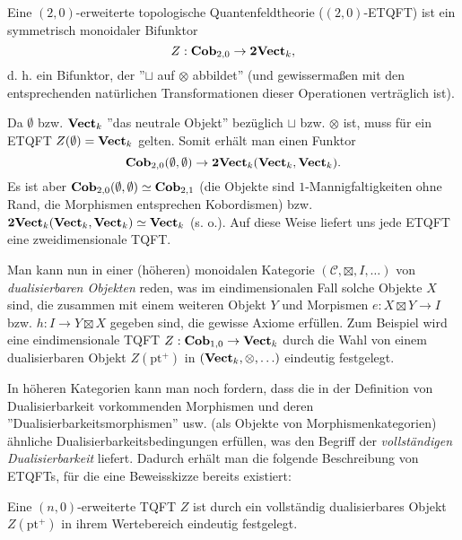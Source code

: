 \begin{Def}
Eine $(2, 0)$-erweiterte topologische Quantenfeldtheorie ($(2, 0)$-ETQFT) ist
ein symmetrisch monoidaler Bifunktor
\begin{equation}
Z: \mathbf{Cob}_{2, 0} \to \mathbf{2Vect}_k, \nonumber
\end{equation}
d. h. ein Bifunktor, der ''$\sqcup$ auf $\otimes$ abbildet'' (und
gewissermaßen mit den entsprechenden natürlichen Transformationen dieser
Operationen verträglich ist).
\end{Def}

Da $\emptyset$ bzw. $\mathbf{Vect}_k$ ''das neutrale Objekt'' bezüglich
$\sqcup$ bzw. $\otimes$ ist, muss für ein ETQFT $Z(\emptyset) =
\mathbf{Vect}_k$ gelten. Somit erhält man einen Funktor
\begin{equation}
\mathbf{Cob}_{2, 0} (\emptyset, \emptyset) \to \mathbf{2Vect}_k
(\mathbf{Vect}_k, \mathbf{Vect}_k). \nonumber
\end{equation}
Es ist aber $\mathbf{Cob}_{2, 0} (\emptyset, \emptyset) \simeq
\mathbf{Cob}_{2, 1}$ (die Objekte sind $1$-Mannigfaltigkeiten ohne Rand,
die Morphismen entsprechen Kobordismen) bzw. $\mathbf{2Vect}_k
(\mathbf{Vect}_k, \mathbf{Vect}_k) \simeq \mathbf{Vect}_k$ (s. o.).
Auf diese Weise liefert uns jede ETQFT eine zweidimensionale TQFT.


Man kann nun in einer (höheren) monoidalen Kategorie $(\mathcal{C},
\boxtimes, I, \ldots)$ von \emph{dualisierbaren Objekten} reden, was im
eindimensionalen Fall solche Objekte $X$ sind, die zusammen mit einem weiteren
Objekt $Y$ und Morpismen $e: X \boxtimes Y \to I$ bzw. $h: I \to Y \boxtimes
X$ gegeben sind, die gewisse Axiome erfüllen. Zum Beispiel wird eine
eindimensionale TQFT $Z: \mathbf{Cob}_{1, 0} \to \mathbf{Vect}_k$ durch die
Wahl von einem dualisierbaren Objekt $Z(\mathrm{pt}^+)$ in $(\mathbf{Vect}_k,
\otimes, \ldots)$ eindeutig festgelegt.

In höheren Kategorien kann man noch fordern, dass die in der Definition von
Dualisierbarkeit vorkommenden Morphismen und deren
''Dualisierbarkeitsmorphismen'' usw. (als Objekte von Morphismenkategorien)
ähnliche Dualisierbarkeitsbedingungen erfüllen, was den Begriff der
\emph{vollständigen Dualisierbarkeit} liefert. Dadurch erhält man die
folgende Beschreibung von ETQFTs, für die eine Beweisskizze bereits
existiert:

\begin{Sat}[Kobordismushypothese]
Eine $(n, 0)$-erweiterte TQFT $Z$ ist durch ein vollständig dualisierbares
Objekt $Z(\mathrm{pt}^+)$ in ihrem Wertebereich eindeutig festgelegt.
\end{Sat}
